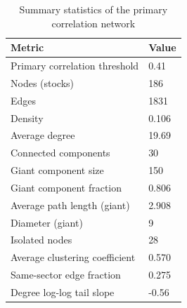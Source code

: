\begin{table}[!ht]
\centering
\caption{Summary statistics of the primary correlation network}
\label{tab:network-summary}
\begin{tabular}{ll}
\toprule
Metric & Value \\
\midrule
Primary correlation threshold & 0.41 \\
Nodes (stocks) & 186 \\
Edges & 1831 \\
Density & 0.106 \\
Average degree & 19.69 \\
Connected components & 30 \\
Giant component size & 150 \\
Giant component fraction & 0.806 \\
Average path length (giant) & 2.908 \\
Diameter (giant) & 9 \\
Isolated nodes & 28 \\
Average clustering coefficient & 0.570 \\
Same-sector edge fraction & 0.275 \\
Degree log-log tail slope & -0.56 \\
\bottomrule
\end{tabular}
\end{table}

